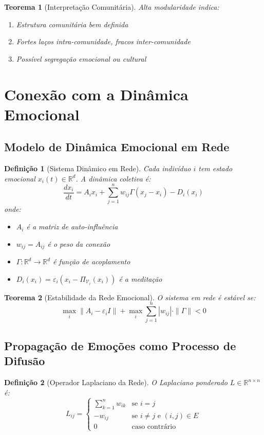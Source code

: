 \documentclass[12pt, a4paper]{article}
\newtheorem{definition}{Definição}
\newtheorem{theorem}{Teorema}
\begin{document}
\begin{theorem}[Interpretação Comunitária]
Alta modularidade indica:
\begin{enumerate}
\item Estrutura comunitária bem definida
\item Fortes laços intra-comunidade, fracos inter-comunidade
\item Possível segregação emocional ou cultural
\end{enumerate}
\end{theorem}

\section{Conexão com a Dinâmica Emocional}

\subsection{Modelo de Dinâmica Emocional em Rede}

\begin{definition}[Sistema Dinâmico em Rede]
Cada indivíduo $i$ tem estado emocional $x_i(t) \in \mathbb{R}^d$. A dinâmica coletiva é:
\[
\frac{dx_i}{dt} = A_i x_i + \sum_{j=1}^n w_{ij} \Gamma(x_j - x_i) - D_i(x_i)
\]
onde:
\begin{itemize}
\item $A_i$ é a matriz de auto-influência
\item $w_{ij} = A_{ij}$ é o peso da conexão
\item $\Gamma: \mathbb{R}^d \to \mathbb{R}^d$ é função de acoplamento
\item $D_i(x_i) = \varepsilon_i (x_i - \Pi_{\mathcal{V}_i}(x_i))$ é a meditação
\end{itemize}
\end{definition}

\begin{theorem}[Estabilidade da Rede Emocional]
O sistema em rede é estável se:
\[
\max_i \|A_i - \varepsilon_i I\| + \max_i \sum_{j=1}^n |w_{ij}| \cdot \|\Gamma\| < 0
\]
\end{theorem}

\subsection{Propagação de Emoções como Processo de Difusão}

\begin{definition}[Operador Laplaciano da Rede]
O Laplaciano ponderado $L \in \mathbb{R}^{n \times n}$ é:
\[
L_{ij} = 
\begin{cases}
\sum_{k=1}^n w_{ik} & \text{se } i = j \\
-w_{ij} & \text{se } i \neq j \text{ e } (i,j) \in E \\
0 & \text{caso contrário}
\end{cases}
\]
\end{definition}
\end{document}
